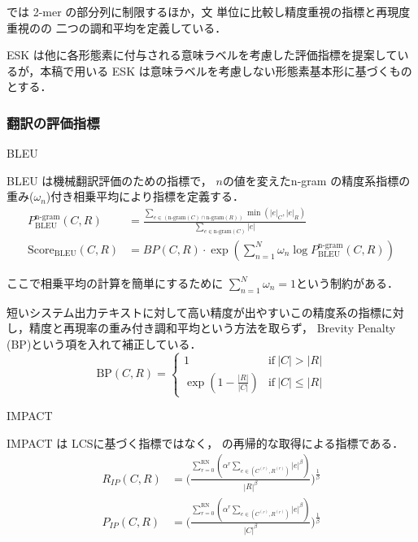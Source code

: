 \documentclass[japanese]{jnlp_1.4}
\renewcommand{\paragraph}{}
\newcommand{\modified}[1]{}
\begin{document}
\cite{hirao-2006-IPSJ-journal}では 2-mer の部分列に制限するほか，文
単位に比較し精度重視の指標と再現度重視の\modified{指標}の
二つの\modified{重みつき}調和平均\modified{($0 \leq \lambda \leq 1$)}を定義している．

ESK は他に各形態素に付与される意味ラベルを考慮した評価指標を提案してい
るが，本稿で用いる ESK は意味ラベルを考慮しない形態素基本形に基づくものとする．


\subsubsection{翻訳の評価指標}

\paragraph{BLEU}

BLEU \cite{Papineni-2001-BLEU} は機械翻訳評価のための指標で，
$n$の値を変えたn-gram の精度系指標の重み($\omega_{n}$)付き相乗平均により指標を定義する．
\begin{align*}
P^{\mbox{n-gram}}_{\mbox{BLEU}} (C,R) & = \frac{\displaystyle \sum_{e \in (\mbox{n-gram}(C) \cap \mbox{n-gram}(R))} \min(|e|_{C},|e|_{R}) }{\displaystyle \sum_{e\in\mbox{n-gram}(C)}|e|} \\
\mbox{Score}_{\mbox{BLEU}} (C,R) & = BP(C,R) \cdot \exp ( \displaystyle
\sum^{N}_{n=1} \omega_{n} \log P^{\mbox{n-gram}}_{\mbox{BLEU}} (C,R) )
\end{align*}

ここで相乗平均の計算を簡単にするために $\sum^{N}_{n=1} \omega_{n} = 1$という制約がある．

短いシステム出力テキストに対して高い精度が出やすいこの精度系の指標に対し，精度と再現率の重み付き調和平均という方法を取らず，
Brevity Penalty (BP)という項を入れて補正している．
\[
 \mbox{BP} (C,R)=
   \left\{
       \begin{array}{ll}
          1 & \mbox{if}\   |C| > |R| \\
          \exp(1- \frac{|R|}{|C|}) & \mbox{if}\ |C| \leq |R|
    \end{array} \right.
\]


\paragraph{IMPACT}
\label{para:IMPACT}

IMPACT\cite{echizen-ya-2007-MTSUMMIT} は LCSに基づく指標ではなく，\modified{LCSubstr} の再帰的な取得による指標である．
{\allowdisplaybreaks
\begin{align*}
 R_{IP} (C,R) & = \Biggl(\displaystyle \frac{\displaystyle \sum^{\mbox{RN}}_{r=0}(\alpha^{r} \sum_{e \in \mbox{\modified{LCSubstr}}(C^{(r)},R^{(r)})}|e|^{\beta})}{|R|^{\beta}}\Biggr)^{\displaystyle \frac{1}{\beta}} \\[1ex]
 P_{IP} (C,R) & = \Biggl(\displaystyle \frac{\displaystyle
\sum^{\mbox{RN}}_{r=0}(\alpha^{r} \sum_{e \in
\mbox{\modified{LCSubstr}}(C^{(r)},R^{(r)})}|e|^{\beta})}{|C|^{\beta}}\Biggr)^{\displaystyle
\frac{1}{\beta}} 
\end{align*}
}
\end{document}
